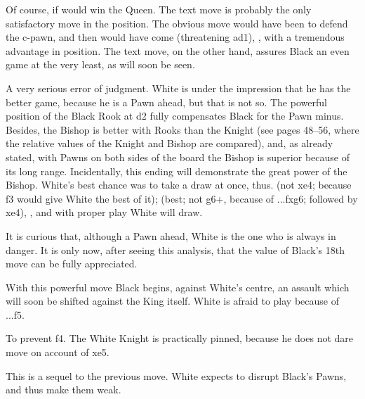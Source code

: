 \documentclass[10pt,twoside]{article}
\begin{document}

Of course, if  would win the Queen. The text move is probably the only satisfactory move in the position. The obvious move would have been  to defend the c-pawn, and then would have come  (threatening \figR ad1), , with a tremendous advantage in position. The text move, on the other hand, assures Black an even game at the very least, as will soon be seen.


A very serious error of judgment. White is under the impression that he has the better game, because he is a Pawn ahead, but that is not so. The powerful position of the Black Rook at d2 fully compensates Black for the Pawn minus. Besides, the Bishop is better with Rooks than the Knight (see pages 48--56, where the relative values of the Knight and Bishop are compared), and, as already stated, with Pawns on both sides of the board the Bishop is superior because of its long range. Incidentally, this ending will demonstrate the great power of the Bishop. White's best chance was to take a draw at once, thus.   (not \figB xe4; because f3 would give White the best of it);  (best; not \figN g6+, because of ...fxg6; followed by \figR xe4), , and with proper play White will draw.

It is curious that, although a Pawn ahead, White is the one who is always in danger. It is only now, after seeing this analysis, that the value of Black's 18th move  can be fully appreciated.


With this powerful move Black begins, against White's centre, an assault which will soon be shifted against the King itself. White is afraid to play  because of ...f5.


To prevent f4. The White Knight is practically pinned, because he does not dare move on account of \figR xe5.

\board


This is a sequel to the previous move. White expects to disrupt Black's Pawns, and thus make them weak.
\end{document}
